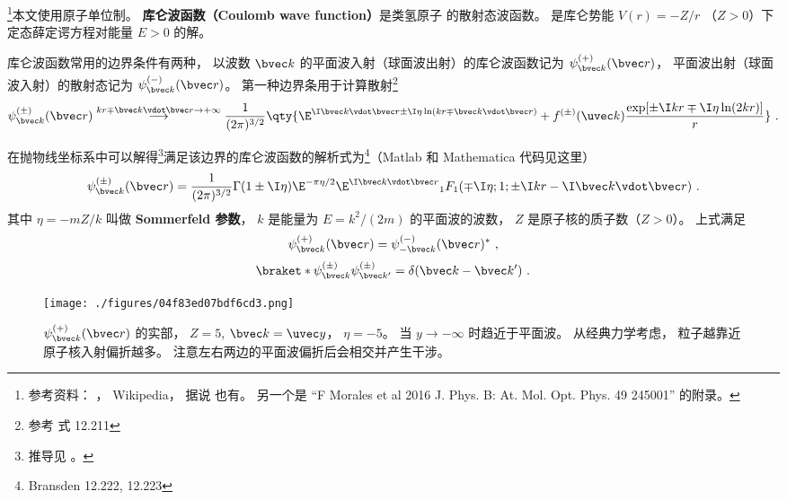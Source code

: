 

\footnote{参考资料： \cite{Bransden}， Wikipedia， 据说 \cite{Merzbacher} 也有。 另一个是 “F Morales et al 2016 J. Phys. B: At. Mol. Opt. Phys. 49 245001” 的附录。}本文使用原子单位制。 \textbf{库仑波函数（Coulomb wave function）}是类氢原子 的散射态波函数。
是库仑势能 $V(r) = -Z/r$ （$Z > 0$）下定态薛定谔方程对能量 $E > 0$ 的解。

库仑波函数常用的边界条件有两种， 以波数 $\bvec k$ 的平面波入射（球面波出射）的库仑波函数记为 $\psi_{\bvec k}^{(+)}(\bvec r)$， 平面波出射（球面波入射）的散射态记为 $\psi_{\bvec k}^{(-)}(\bvec r)$。 第一种边界条用于计算散射\footnote{参考\cite{Bransden} 式 12.211}
\begin{equation}\label{eq_CulmWf_4}
\psi_{\bvec k}^{(\pm)}(\bvec r) \overset{kr \mp \bvec k \vdot\bvec r \to +\infty}{\longrightarrow} \frac{1}{(2\pi)^{3/2}} \qty{\E^{\I\bvec k\vdot\bvec r \pm \I\eta\ln (kr \mp \bvec k \vdot\bvec r)}
+ f^{(\pm)}(\uvec k) \frac{\exp[\pm\I kr \mp \I\eta \ln(2kr)]}{r}}~.
\end{equation}

在抛物线坐标系中可以解得\footnote{推导见 \cite{Bransden}。}满足该边界的库仑波函数的解析式为\footnote{Bransden\cite{Bransden} 12.222, 12.223}（Matlab 和 Mathematica 代码见这里）
\begin{equation}\label{eq_CulmWf_7}
\psi_{\bvec k}^{(\pm)}(\bvec r) = \frac{1}{(2\pi)^{3/2}} \Gamma(1\pm \I\eta)\E^{-\pi\eta/2} \E^{\I\bvec k\vdot\bvec r} {_1F_1}(\mp\I\eta; 1; \pm\I kr - \I \bvec k\vdot \bvec r)~.
\end{equation}
其中 $\eta = -mZ/k$ 叫做 \textbf{Sommerfeld 参数}， $k$ 是能量为 $E = k^2/(2m)$ 的平面波的波数， $Z$ 是原子核的质子数（$Z > 0$）。 上式满足
\begin{equation}
\psi_{\bvec k}^{(+)}(\bvec r) = \psi_{-\bvec k}^{(-)}(\bvec r)^*~,
\end{equation}
\begin{equation}
\braket*{\psi_{\bvec k}^{(\pm)}}{\psi_{\bvec k'}^{(\pm)}} = \delta(\bvec k - \bvec k')~.
\end{equation}

\begin{figure}[ht]
\centering
\texttt{[image: ./figures/04f83ed07bdf6cd3.png]} %
\caption{$\psi_{\bvec k}^{(+)}(\bvec r)$ 的实部， $Z = 5$, $\bvec k = \uvec y$， $\eta = -5$。 当 $y \to -\infty$ 时趋近于平面波。 从经典力学考虑， 粒子越靠近原子核入射偏折越多。 注意左右两边的平面波偏折后会相交并产生干涉。} \label{fig_CulmWf_2}
\end{figure}

